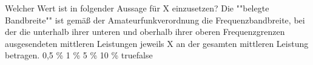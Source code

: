     {Welcher Wert ist in folgender Aussage für X einzusetzen? Die ""belegte Bandbreite"" ist gemäß der Amateurfunkverordnung die Frequenzbandbreite, bei der die unterhalb ihrer unteren und oberhalb ihrer oberen Frequenzgrenzen ausgesendeten mittleren Leistungen jeweils X an der gesamten mittleren Leistung betragen.}
    {0,5 \%}
    {1 \%}
    {5 \%}
    {10 \%}
    {true}{false}